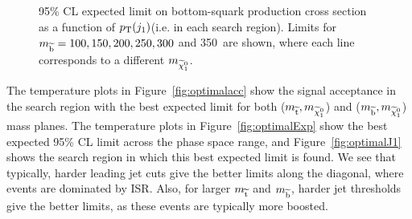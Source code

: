 \begin{figure}[!Hhtb]
\begin{center}
  \caption{95\% \ac{CL} expected limit on bottom-squark production cross section as a function of $p_{\text{T}}(j_{1})$\GeV (i.e. in each search region). Limits for $m_{\widetilde{{\rm b}}}=100,150,200,250,300$ and 350~\GeV are shown, where each line corresponds to a different $m_{\widetilde{\chi}^{0}_{1}}$.}
  \label{fig:expLimSbot}
  \end{center}
\end{figure}


The temperature plots in Figure~\ref{fig:optimalacc} show the signal acceptance in the search region with the best expected limit for both ($m_{\widetilde{{\rm t}}}, m_{\widetilde{\chi}^{0}_{1}}$) and ($m_{\widetilde{{\rm b}}}, m_{\widetilde{\chi}^{0}_{1}}$) mass planes.
The temperature plots in Figure~\ref{fig:optimalExp} show the best expected 95\% \ac{CL} limit across the phase space range, and Figure~\ref{fig:optimalJ1} shows the search region in which this best expected limit is found.
We see that typically, harder leading jet cuts give the better limits along the diagonal, where events are dominated by ISR. 
Also, for larger $m_{\widetilde{{\rm t}}}$ and $m_{\widetilde{{\rm b}}}$, harder jet thresholds give the better limits, as these events are typically more boosted.   


